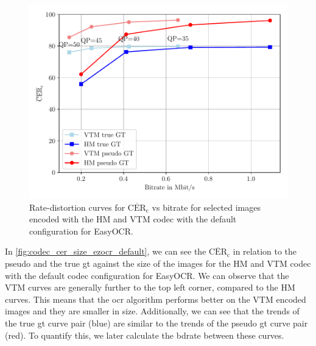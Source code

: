 \begin{figure}[h!]
    \centering
    \includegraphics[width=\textwidth]{../images/analyze/codec_cer_size_ezocr_default.pdf}
    \caption{Rate-distortion curves for $\overline{\text{CER}}_{\text{c}}$ vs bitrate for selected images encoded with the HM and VTM codec with the default configuration for EasyOCR.}
    \label{fig:codec_cer_size_ezocr_default}
\end{figure}

In \autoref{fig:codec_cer_size_ezocr_default}, we can see the $\overline{\text{CER}}_{\text{c}}$ in relation to the pseudo and the true \gls{gt} against the size of the images for the HM and VTM codec with the default codec configuration for EasyOCR.
We can observe that the VTM curves are generally further to the top left corner, compared to the HM curves.
This means that the \gls{ocr} algorithm performs better on the VTM encoded images and they are smaller in size.
Additionally, we can see that the trends of the true \gls{gt} curve pair (blue) are similar to the trends of the pseudo \gls{gt} curve pair (red).
To quantify this, we later calculate the \gls{bdrate} between these curves.

